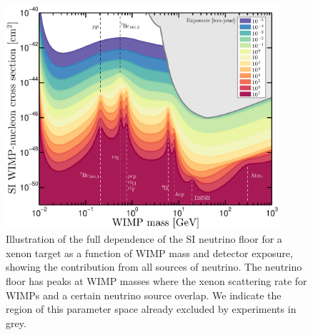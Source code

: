 \begin{figure}
\begin{center}
\includegraphics[trim = 0mm 0 0mm 0mm, clip, width=0.9\textwidth,angle=0]{Figures/EL_vs_mass_allNeutrinos.eps}
\caption[The complete SI xenon neutrino floor]{Illustration of the full dependence of the SI neutrino floor for a xenon target as a function of WIMP mass and detector exposure, showing the contribution from all sources of neutrino. The neutrino floor has peaks at WIMP masses where the xenon scattering rate for WIMPs and a certain neutrino source overlap. We indicate the region of this parameter space already excluded by experiments in grey.}
\label{fig:EL_vs_mass_allNeutrinos}
\end{center}
\end{figure} 
